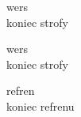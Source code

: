 \begin{text}
    wers\\
    koniec strofy

    wers\\
    koniec strofy

    \hfill\break %
    \vin refren\\
    \vin koniec refrenu
\end{text}
\begin{chord}

\end{chord}